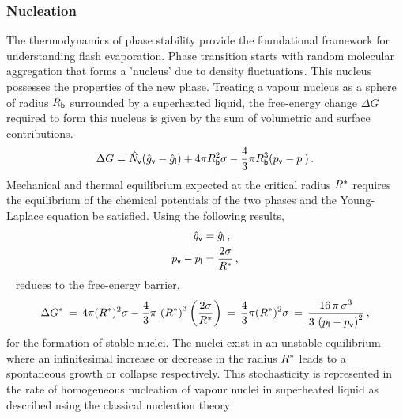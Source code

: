 \subsubsection*{Nucleation}\par\vspace{-\baselineskip}\vspace{\parskip}
The thermodynamics of phase stability provide the foundational 
framework for understanding flash evaporation. Phase transition starts with random molecular aggregation that forms a 'nucleus' due to density fluctuations. 
This nucleus possesses the properties of the new phase.
Treating a vapour
nucleus as a sphere of radius $R_{\mathsf {b}}$ surrounded by a superheated liquid, 
the free-energy change $\Delta G$ required to form this nucleus is 
given by the sum of volumetric and surface contributions.
\begin{equation}\label{eq:delta-gibbs}
  \Delta G  =  \hat{N}_{\mathsf {v}}(\hat{g}_{\mathsf {v}} - \hat{g}_{\mathsf {l}}) 
  + 4\pi R_{\mathsf {b}}^{2} \sigma 
  - \frac{4}{3} \pi R_{\mathsf {b}}^{3}(p_{\mathsf {v}} - p_{\mathsf {l}})\,.
\end{equation}
Mechanical and thermal equilibrium expected at the critical radius \(R^{\mathsf {*}}\) requires 
the equilibrium of the chemical potentials of the two phases and the Young-Laplace equation
be satisfied. Using the following results,
\begin{subequations}
  \begin{align}
    \hat{g}_{\mathsf {v}} & = \hat{g}_{\mathsf {l}}\,,\\
    p_{\mathsf {v}} - p_{\mathsf {l}} & = \frac{2\sigma}{R^{\mathsf {*}}}\,,
  \end{align}
\end{subequations}
~ reduces to the free-energy barrier,
\begin{equation}\label{eq:energy-barrier}
  \Delta G^{\mathsf {*}}\,=\,4\pi (R^{\mathsf {*}})^{2} \sigma - \frac{4}{3} \pi\,\left(R^{\mathsf {*}}\right)^{3}\left(\frac{2\sigma}{R^{\mathsf {*}}}\right)\,=\,\frac{4}{3} \pi (R^{\mathsf {*}})^{2} \sigma\,= \,\frac{16\,\pi\,\sigma^{3}}{3\,\left(p_{\mathsf {l}} - p_{\mathsf {v}}\right)^{2}}\,, 
\end{equation}
for the formation of stable nuclei. The nuclei exist in an unstable equilibrium where an infinitesimal 
 increase or decrease in the radius \(R^{\mathsf {*}}\) leads to a spontaneous growth or collapse respectively.
This stochasticity is represented in the rate of homogeneous nucleation of vapour nuclei in superheated liquid as described using the classical nucleation theory
